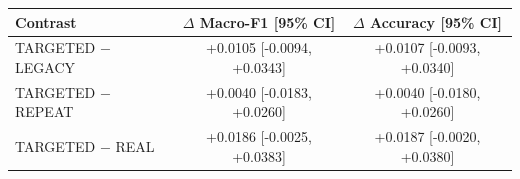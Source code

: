 \begin{tabular}{lcc}
\hline
Contrast & $\Delta$ Macro-F1 [95\% CI] & $\Delta$ Accuracy [95\% CI] \\
\hline
TARGETED $-$ LEGACY & +0.0105 [-0.0094, +0.0343] & +0.0107 [-0.0093, +0.0340] \\
TARGETED $-$ REPEAT & +0.0040 [-0.0183, +0.0260] & +0.0040 [-0.0180, +0.0260] \\
TARGETED $-$ REAL & +0.0186 [-0.0025, +0.0383] & +0.0187 [-0.0020, +0.0380] \\
\hline
\end{tabular}
